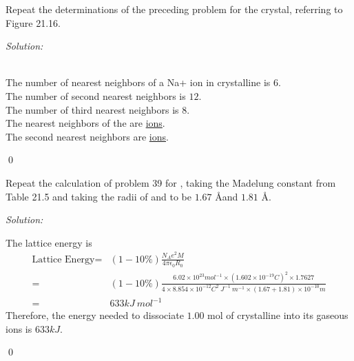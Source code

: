 \documentclass[12pt]{article}
\newenvironment{problem}[2][Problem]{\begin{trivlist}
\item[\hskip \labelsep {\bfseries #1}\hskip \labelsep {\bfseries #2.}]}{\end{trivlist}}
\newenvironment{sol}
    {\emph{Solution:}
    }
    {
    \qed
    }
\begin{document}
\begin{problem}{21.34}
Repeat the determinations of the preceding problem for the  crystal, referring to Figure 21.16.
\end{problem}
\begin{sol}
\\The number of nearest neighbors of a {Na+} ion in crystalline  is \uline{$6$}.\\
The number of second nearest neighbors is \uline{$12$}.\\
The number of third nearest neighbors is \uline{$8$}.\\
The nearest neighbors of the  are \uline{ ions}.\\
The second nearest neighbors are \uline{ ions}.
\end{sol}

\begin{problem}{21.40}
Repeat the calculation of problem 39 for , taking the Madelung constant from Table 21.5 and taking the radii of  and  to be $1.67$ \AA and $1.81$ \AA.
\end{problem}
\begin{sol}
The lattice energy is
\begin{align*}
\text{Lattice Energy}=&(1-10\%)\frac{N_Ae^2M}{4\pi\epsilon_0R_0}\\
=&(1-10\%)\frac{6.02\times10^{23}mol^{-1}\times(1.602\times10^{-19}C)^2\times1.7627}{4\times8.854\times10^{-12}C^2~J^{-1}~m^{-1}\times(1.67+1.81)\times10^{-10}m}\\
=&633kJ~mol^{-1}
\end{align*}
Therefore, the energy needed to dissociate $1.00$ mol of crystalline  into its gaseous ions is \uline{$633kJ$}.
\end{sol}
\end{document}
